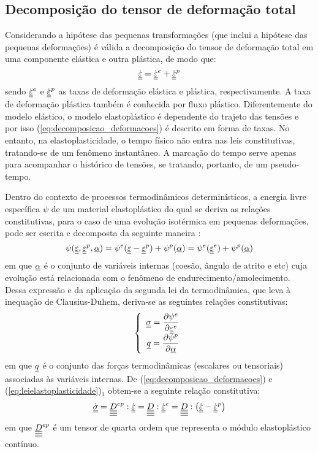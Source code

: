 \subsection{Decomposição do tensor de deformação total}
Considerando a hipótese das pequenas transformações (que inclui a hipótese das pequenas deformações) é válida a decomposição do tensor de deformação total em uma componente elástica e outra plástica, de modo que:
\begin{equation}
	\label{eq:decomposicao_deformacoes}
	\dot {\underline{\underline \varepsilon}} = \dot {\underline{\underline \varepsilon}}^e + \dot {\underline{\underline \varepsilon}}^p 
\end{equation}
sendo $\dot {\underline{\underline \varepsilon}}^e$ e $\dot {\underline{\underline \varepsilon}}^p$ as taxas de deformação elástica e plástica, respectivamente. A taxa de deformação plástica também é conhecida por fluxo plástico. Diferentemente do modelo elástico, o modelo elastoplástico é dependente do trajeto das tensões e por isso (\ref{eq:decomposicao_deformacoes}) é descrito em forma de taxas. No entanto, na elastoplasticidade, o tempo físico não entra nas leis constitutivas, tratando-se de um fenômeno instantâneo. A marcação do tempo serve apenas para acompanhar o histórico de tensões, se tratando, portanto, de um pseudo-tempo.

Dentro do contexto de processos termodinâmicos determinísticos, a energia livre específica $\psi$ de um material elastoplástico do qual se deriva as relações constitutivas, para o caso de uma evolução isotérmica em pequenas deformações, pode ser escrita e decomposta da seguinte maneira \cite[p. 149]{Neto2008}:
\begin{equation}
	\label{eq:energia_livre}
	\psi(\underline{\underline \varepsilon},\underline{\underline \varepsilon}^p,\underline \alpha) = \psi^e(\underline{\underline \varepsilon}-\underline{\underline \varepsilon}^p)+ \psi^p(\underline \alpha) = \psi^e(\underline{\underline \varepsilon}^e)+ \psi^p(\underline \alpha) 
\end{equation}
em que $\underline \alpha$ é o conjunto de variáveis internas (coesão, ângulo de atrito e etc) cuja evolução está relacionada com o fenômeno de endurecimento/amolecimento. Dessa expressão e da aplicação da segunda lei da termodinâmica, que leva à inequação de Clausius-Duhem, deriva-se as seguintes relações constitutivas:
\begin{equation}
	\label{eq:leielastoplasticidade}
		\left\{
		\begin{array}{rcl}
			\underline{\underline \sigma} = \dfrac{\partial \psi^e}{\partial \underline{\underline \varepsilon}^e} \\ 
			\underline q = \dfrac{\partial \psi^p}{\partial \underline \alpha}
			
		\end{array}
		\right.
\end{equation}
em que $\underline q$ é o conjunto das forças termodinâmicas (escalares ou tensoriais) associadas às variáveis internas. De (\ref{eq:decomposicao_deformacoes}) e (\ref{eq:leielastoplasticidade})$_1$ obtem-se a seguinte relação constitutiva:
\begin{equation}
	\label{eq:leielastoplastica}
	\dot {\underline{\underline \sigma}} = \underline{\underline{\underline{\underline D}}}^{ep}:\dot {\underline{\underline \varepsilon}} = \underline{\underline{\underline{\underline D}}}:\dot {\underline{\underline \varepsilon}}^e = \underline{\underline{\underline{\underline D}}}:\left(\dot {\underline{\underline \varepsilon}} - \dot {\underline{\underline \varepsilon}}^p \right)
\end{equation}
em que $\underline{\underline{\underline{\underline D}}}^{ep}$ é um tensor de quarta ordem que representa o módulo elastoplástico contínuo.

